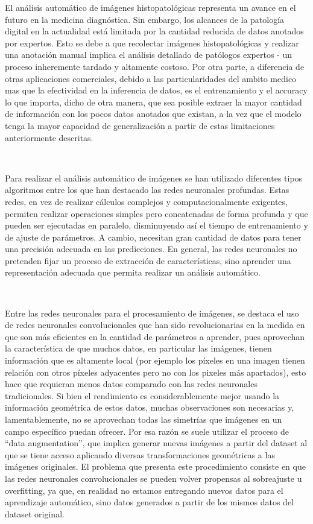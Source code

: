 \documentclass[12pt,letterpaper,final, openany]{scrbook}
\begin{document}
El análisis automático de imágenes histopatológicas representa un avance en el futuro en la medicina diagnóstica. Sin embargo, los alcances de la patología digital en la actualidad está limitada por la cantidad reducida de datos anotados por expertos. Esto se debe a que recolectar imágenes histopatológicas y realizar una anotación manual implica el análisis detallado de patólogos expertos - un proceso inheremente tardado y altamente costoso. Por otra parte, a diferencia de otras aplicaciones comerciales, debido a las particularidades del ambito medico mas que la efectividad en la inferencia de datos, es el entrenamiento y el accuracy lo que importa, dicho de otra manera, que sea posible extraer la mayor cantidad de información con los pocos datos anotados que existan, a la vez que el modelo tenga la mayor capacidad de generalización a partir de estas limitaciones anteriormente descritas.

\\
\vspace{4mm}

Para realizar el análisis automático de imágenes se han utilizado diferentes tipos algoritmos entre los que han destacado las redes neuronales profundas. Estas redes, en vez de realizar cálculos complejos y computacionalmente exigentes, permiten realizar operaciones simples pero concatenadas de forma profunda y que pueden ser ejecutadas en paralelo, disminuyendo así el tiempo de entrenamiento y de ajuste de parámetros. A cambio, necesitan gran cantidad de datos para tener una precisión adecuada en las predicciones. En general, las redes neuronales no pretenden fijar un proceso de extracción de características, sino aprender una representación adecuada que permita realizar un análisis automático.

\\
\vspace{4mm}

Entre las redes neuronales para el procesamiento de imágenes, se destaca el uso de redes neuronales convolucionales que han sido revolucionarias en la medida en que son más eficientes en la cantidad de parámetros a aprender, pues aprovechan la característica de que muchos datos, en particular las imágenes, tienen información que es altamente local (por ejemplo los píxeles en una imagen tienen relación con otros píxeles adyacentes pero no con los pixeles más apartados), esto hace que requieran menos datos comparado con las redes neuronales tradicionales. Si bien el rendimiento es considerablemente mejor usando la información geométrica de estos datos, muchas observaciones son necesarias y, lamentablemente, no se aprovechan todas las simetrías que imágenes en un campo específico puedan ofrecer. Por esa razón se suele utilizar el proceso de “data augmentation”, que implica generar nuevas imágenes a partir del dataset al que se tiene acceso aplicando diversas transformaciones geométricas a las imágenes originales. El problema que presenta este procedimiento consiste en que las redes neuronales convolucionales se pueden volver propensas al sobreajuste u overfitting, ya que, en realidad no estamos entregando nuevos datos para el aprendizaje automático, sino datos generados a partir de los mismos datos del dataset original.
\end{document}
